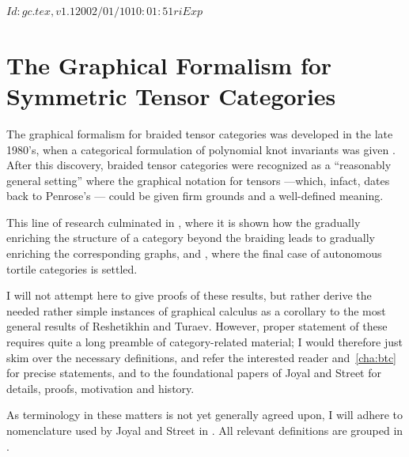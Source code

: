 \RCSID $Id: gc.tex,v 1.1 2002/01/10 10:01:51 ri Exp $


\chapter{The Graphical Formalism for Symmetric Tensor Categories}
\label{cha:gc}

The graphical formalism for braided tensor categories was developed in
the late 1980's, when a categorical formulation of polynomial knot
invariants was given \cite{freyd-yetter;btc, turaev;yang-baxter}.
After this discovery, braided tensor categories were recognized as a
``reasonably general setting'' \cite{joyal-street;tensor-calculus}
where the graphical notation for tensors ---which, infact, dates back
to Penrose's \cite{penrose;negative-dimensional-tensors}--- could be
given firm grounds and a well-defined meaning.

This line of research culminated in
\cite{joyal-street;tensor-calculus}, where it is shown how
the gradually enriching the structure of a category beyond the
braiding leads to gradually enriching the corresponding graphs, and
\cite{reshetikhin-turaev;ribbon-graphs}, where the final case of
autonomous tortile categories is settled.

I will not attempt here to give proofs of these results, but rather
derive the needed rather simple instances of graphical calculus as a
corollary to the most general results of Reshetikhin and Turaev.
However, proper statement of these requires quite a long preamble of
category-related material; I would therefore just skim over the
necessary definitions, and refer the interested reader 
and~\ref{cha:btc} for precise statements, and to the foundational
papers of Joyal and Street \cite{joyal-street;tensor-calculus,
  joyal-street;btc} for details, proofs, motivation and history.

As terminology in these matters is not yet generally agreed upon, I
will adhere to nomenclature used by Joyal and Street in
\cite{joyal-street;tensor-calculus, joyal-street;btc}. All relevant
definitions are grouped in .


